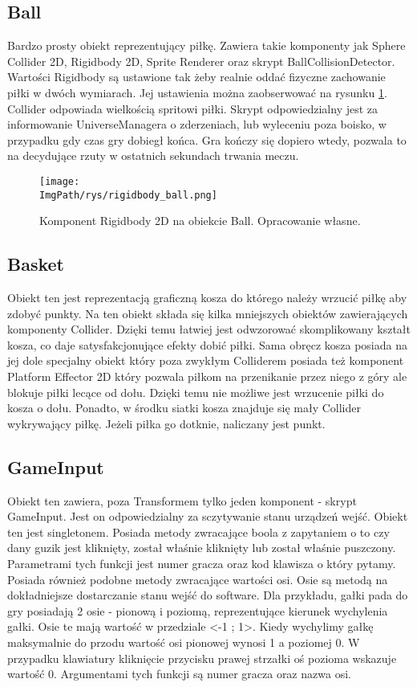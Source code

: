 \documentclass[a4paper,12pt,twoside,openany]{report}
\newcommand{\ImgPath}{.}
\begin{document}
\subsection{Ball}
\label{ball}
Bardzo prosty obiekt reprezentujący piłkę. Zawiera takie komponenty jak Sphere Collider 2D, Rigidbody 2D, Sprite Renderer oraz skrypt BallCollisionDetector. Wartości Rigidbody są ustawione tak żeby realnie oddać fizyczne zachowanie piłki w dwóch wymiarach. Jej ustawienia można zaobserwować na rysunku \ref{rigidbody_ball}. Collider odpowiada wielkością spritowi piłki. Skrypt odpowiedzialny jest za informowanie UniverseManagera o zderzeniach, lub wyleceniu poza boisko, w przypadku gdy czas gry dobiegł końca. Gra kończy się dopiero wtedy, pozwala to na decydujące rzuty w ostatnich sekundach trwania meczu.

\begin{figure}[H]
	\begin{center}
\centering
\texttt{[image: \\ImgPath/rys/rigidbody\_ball.png]}
\end{center}
	\caption{Komponent Rigidbody 2D na obiekcie Ball. Opracowanie własne.}
	\label{rigidbody_ball}
\end{figure}

\subsection{Basket}
\label{basket}

Obiekt ten jest reprezentacją graficzną kosza do którego należy wrzucić piłkę aby zdobyć punkty. Na ten obiekt składa się kilka mniejszych obiektów zawierających komponenty Collider. Dzięki temu łatwiej jest odwzorować skomplikowany kształt kosza, co daje satysfakcjonujące efekty dobić piłki. Sama obręcz kosza posiada na jej dole specjalny obiekt który poza zwykłym Colliderem posiada też komponent Platform Effector 2D który pozwala piłkom na przenikanie przez niego z góry ale blokuje piłki lecące od dołu. Dzięki temu nie możliwe jest wrzucenie piłki do kosza o dołu. Ponadto, w środku siatki kosza znajduje się mały Collider wykrywający piłkę. Jeżeli piłka go dotknie, naliczany jest punkt.

\subsection{GameInput}
\label{gameinput}
Obiekt ten zawiera, poza Transformem tylko jeden komponent - skrypt GameInput. Jest on odpowiedzialny za sczytywanie stanu urządzeń wejść. Obiekt ten jest singletonem. Posiada metody zwracające boola z zapytaniem o to czy dany guzik jest kliknięty, został właśnie kliknięty lub został właśnie puszczony. Parametrami tych funkcji jest numer gracza oraz kod klawisza o który pytamy. Posiada również podobne metody zwracające wartości osi. Osie są metodą na dokładniejsze dostarczanie stanu wejść do software. Dla przykładu, gałki pada do gry posiadają 2 osie - pionową i poziomą, reprezentujące kierunek wychylenia gałki. Osie te mają wartość w przedziale <-1 ; 1>. Kiedy wychylimy gałkę maksymalnie do przodu wartość osi pionowej wynosi 1 a poziomej 0. W przypadku klawiatury kliknięcie przycisku prawej strzałki oś pozioma wskazuje wartość 0. Argumentami tych funkcji są numer gracza oraz nazwa osi. 
\end{document}
